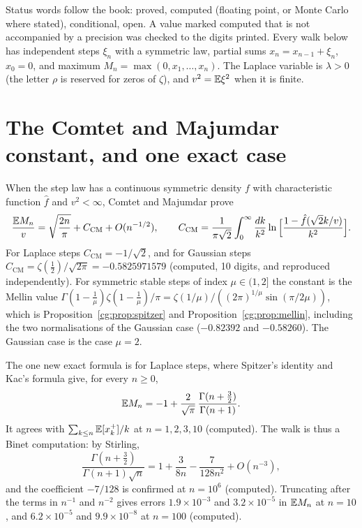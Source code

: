 Status words follow the book: proved, computed (floating point, or Monte Carlo where stated), conditional, open. A value marked computed that is not accompanied by a precision was checked to the digits printed. Every walk below has independent steps $\xi_n$ with a symmetric law, partial sums $x_n=x_{n-1}+\xi_n$, $x_0=0$, and maximum $M_n=\max(0,x_1,\dots,x_n)$. The Laplace variable is $\lambda>0$ (the letter $\rho$ is reserved for zeros of $\zeta$), and $v^2=\mathbb{E}\xi^2$ when it is finite.

\section{The Comtet and Majumdar constant, and one exact case}\label{cw:sec:cm}

When the step law has a continuous symmetric density $f$ with characteristic function $\hat f$ and $v^2<\infty$, Comtet and Majumdar prove
\begin{equation}\label{cw:eq:cm}
\frac{\mathbb{E} M_n}{v}=\sqrt{\frac{2n}{\pi}}+C_{\mathrm{CM}}+O(n^{-1/2}),\qquad
C_{\mathrm{CM}}=\frac{1}{\pi\sqrt2}\int_0^\infty\frac{dk}{k^2}\ln\Big[\frac{1-\hat f(\sqrt2k/v)}{k^2}\Big].
\end{equation}
For Laplace steps $C_{\mathrm{CM}}=-1/\sqrt2$, and for Gaussian steps $C_{\mathrm{CM}}=\zeta(\tfrac12)/\sqrt{2\pi}=-0.5825971579$ (computed, 10 digits, and reproduced independently). For symmetric stable steps of index $\mu\in(1,2]$ the constant is the Mellin value $\Gamma(1-\tfrac1\mu)\zeta(1-\tfrac1\mu)/\pi=\zeta(1/\mu)/((2\pi)^{1/\mu}\sin(\pi/2\mu))$, which is Proposition~\ref{cg:prop:spitzer} and Proposition~\ref{cg:prop:mellin}, including the two normalisations of the Gaussian case ($-0.82392$ and $-0.58260$). The Gaussian case is the case $\mu=2$.

The one new exact formula is for Laplace steps, where Spitzer's identity and Kac's formula give, for every $n\ge0$,
\begin{equation}\label{cw:eq:laplace}
\mathbb{E} M_n=-1+\frac{2}{\sqrt\pi}\,\frac{\Gamma(n+\frac32)}{\Gamma(n+1)}.
\end{equation}
It agrees with $\sum_{k\le n}\mathbb{E}[x_k^+]/k$ at $n=1,2,3,10$ (computed). The walk is thus a Binet computation: by Stirling,
\[
\frac{\Gamma(n+\frac32)}{\Gamma(n+1)\sqrt n}=1+\frac{3}{8n}-\frac{7}{128n^2}+O(n^{-3}),
\]
and the coefficient $-7/128$ is confirmed at $n=10^6$ (computed). Truncating after the terms in $n^{-1}$ and $n^{-2}$ gives errors $1.9\times10^{-3}$ and $3.2\times10^{-5}$ in $\mathbb{E} M_n$ at $n=10$, and $6.2\times10^{-5}$ and $9.9\times10^{-8}$ at $n=100$ (computed).

